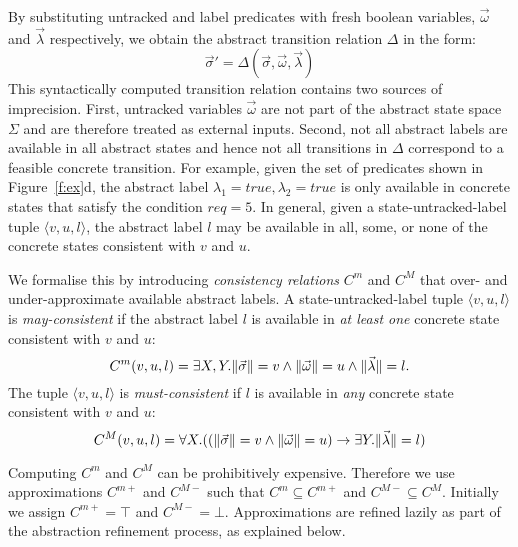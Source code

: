 \documentclass{book}
\newcommand{\vect}[1]{\vec{#1}}
\theoremstyle{definition}
\begin{document}
By substituting untracked and label predicates with fresh boolean 
variables, $\vect{\omega}$ and $\vect{\lambda}$ respectively, we 
obtain the abstract transition relation $\Delta$ in the form:
$$
\vect{\sigma}'=\Delta(\vect{\sigma},\vect{\omega},\vect{\lambda})
$$
This syntactically computed transition relation contains two 
sources of imprecision.  First, untracked variables 
$\vect{\omega}$ are not part of the abstract state space $\Sigma$ 
and are therefore treated as external inputs.  
Second, not all abstract labels  
are available in all abstract states and hence 
not all transitions in $\Delta$ correspond to a feasible concrete 
transition.  For example, given the set of predicates shown in 
Figure~\ref{f:ex}d, the abstract label $\lambda_1 = true, 
\lambda_2 = true$ is only available in concrete states that 
satisfy the condition $req=5$.  In general, given a 
state-untracked-label tuple $\langle v,u,l\rangle$, the abstract 
label $l$ may be available in all, some, or none of the concrete 
states consistent with $v$ and $u$.  

We formalise this by introducing \emph{consistency relations} 
$C^m$ and $C^M$ that over- and under-approximate available 
abstract labels.  A state-untracked-label tuple $\langle 
v,u,l\rangle$ is \emph{may-consistent} if the abstract label $l$ 
is available in \emph{at least one} concrete state consistent with 
$v$ and $u$:
\begin{equation} \label{e:Cm}
    \small
    C^m(v,u,l) = \exists X,Y. \|\vect{\sigma}\|=v \land \|\vect{\omega}\|=u \land \|\vect{\lambda}\|=l.
\end{equation}
The tuple $\langle v,u,l\rangle$ is \emph{must-consistent} if $l$ 
is available in \emph{any} concrete state consistent with $v$ and 
$u$:
\begin{equation}
    \small
    C^M(v,u,l) = \forall X . ((\|\vect{\sigma}\|=v \land \|\vect{\omega}\|=u) \rightarrow \exists Y.  \|\vect{\lambda}\|=l)
\end{equation}

Computing $C^m$ and $C^M$ can be prohibitively expensive.  
Therefore we use approximations $C^{m+}$ and $C^{M-}$ such that 
$C^m\subseteq C^{m+}$ and $C^{M-}\subseteq C^M$.  Initially we 
assign $C^{m+}=\top$ and $C^{M-}=\bot$.  Approximations are 
refined lazily as part of the abstraction refinement process, as 
explained below.
\end{document}
